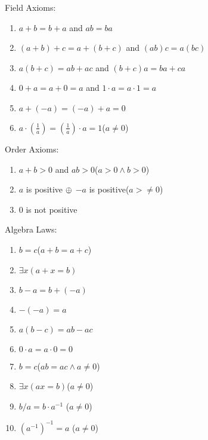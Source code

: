 \documentclass[12pt, a4paper]{article}
\begin{document}
\begin{minipage}[t][0.55\textheight]{\textwidth}
\noindent
    \begin{minipage}{0.48\textwidth}
      Field Axioms:
      \begin{enumerate}[F\arabic*.]
        \item $a+b=b+a$ and $ab=ba$ 
        \item $(a+b)+c=a+(b+c)$ and $(ab)c=a(bc)$ 
        \item $a(b+c)=ab+ac$ and $(b+c)a=ba+ca$ 
        \item $0+a=a+0=a$ and $1\cdot a = a\cdot 1 = a$ 
        \item $a+(-a)=(-a)+a=0$ 
        \item $\displaystyle a\cdot(\frac{1}{a})=(\frac{1}{a})\cdot a=1$\hfill($a\neq 0$)
      \end{enumerate}
      \vspace{1.5em}
      Order Axioms:
      \begin{enumerate}[O\arabic*.]
        \item $a+b>0$ and $ab > 0$\hfill($a>0 \land b>0$)
        \item $a$ is positive $\oplus$ $-a$ is positive\hfill($a>\neq0$)
        \item $0$ is not positive
      \end{enumerate}
      \vspace{1.5em}
      Algebra Laws:
      \begin{enumerate}[T\arabic*.]
        \item $b=c$\hfill($a+b=a+c$)
        \item $\exists x(a+x=b)$ 
        \item $b-a=b+(-a)$ 
        \item $-(-a)=a$ 
        \item $a(b-c)=ab-ac$ 
        \item $0\cdot a = a\cdot 0 = 0$ 
        \item $b=c$\hfill($ab=ac \land a\neq0$) 
        \item $\exists x(ax = b)$\hfill($a\neq 0$) 
        \item $b/a = b\cdot a^{-1}$ \hfill($a\neq 0$) 
      \end{enumerate}
    \end{minipage} \hfill
    \begin{minipage}{0.48\textwidth}
      \begin{enumerate}[T\arabic*.]
        \setcounter{enumi}{9}
        \item $(a^{-1})^{-1} = a$ \hfill($a\neq 0$) 

\end{enumerate}
\end{minipage}
\end{minipage}
\end{document}
